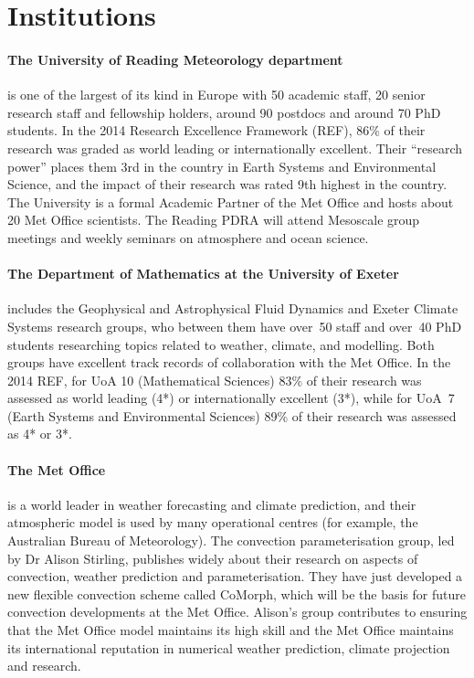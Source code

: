 \documentclass[11pt,a4paper]{article}
\begin{document}
\section*{Institutions}

\paragraph*{The University of Reading Meteorology department} is one of the largest of its kind in Europe with 50 academic staff, 20 senior research staff and fellowship holders, around 90 postdocs and around 70 PhD students. In the 2014 Research Excellence Framework (REF), 86\% of their research was graded as world leading or internationally excellent. Their ``research power'' places them 3rd in the country in Earth Systems and Environmental Science, and the impact of their research was rated 9th highest in the country. The University is a formal Academic Partner of the Met Office and hosts about 20 Met Office scientists. The Reading PDRA will attend Mesoscale group meetings and weekly seminars on atmosphere and ocean science.

\paragraph*{The Department of Mathematics at the University of Exeter} includes the Geophysical and Astrophysical Fluid Dynamics and Exeter Climate Systems research groups, who between them have over~50 staff and over~40 PhD students researching topics related to weather, climate, and modelling. Both groups have excellent track records of collaboration with the Met Office. In the 2014 REF, for UoA 10 (Mathematical Sciences) 83\% of their research was assessed as world leading (4*) or internationally excellent (3*), while for UoA~7 (Earth Systems and Environmental Sciences) 89\% of their research was assessed as 4* or 3*.

\paragraph*{The Met Office} is a world leader in weather forecasting and climate prediction, and their atmospheric model is used by many operational centres (for example, the Australian Bureau of Meteorology). The convection parameterisation group, led by Dr Alison Stirling, publishes widely about their research on aspects of convection, weather prediction and parameterisation. They have just developed a new flexible convection scheme called CoMorph, which will be the basis for future convection developments at the Met Office. Alison's group contributes to ensuring that the Met Office model maintains its high skill and the Met Office maintains its international reputation in numerical weather prediction, climate projection and research. 
\end{document}
